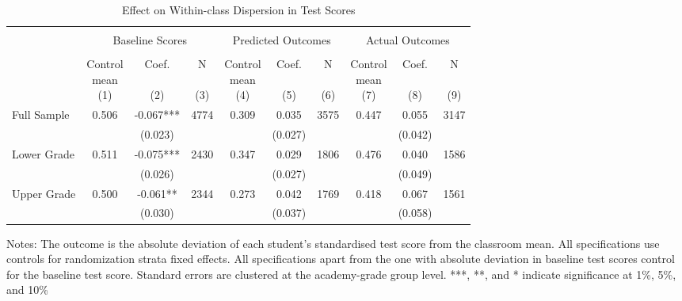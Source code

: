 \begin{table}[!h]
\centering\centering
\caption{Effect on Within-class Dispersion in Test Scores}
\centering
\begin{threeparttable}
\fontsize{10}{12}\selectfont
\begin{tabular}[t]{lccccccccc}
\toprule
\multicolumn{10}{c}{ } \\

\multicolumn{1}{c}{ } & \multicolumn{3}{c}{Baseline Scores} & \multicolumn{3}{c}{Predicted Outcomes} & \multicolumn{3}{c}{Actual Outcomes} \\
\cmidrule(l{3pt}r{3pt}){2-4} \cmidrule(l{3pt}r{3pt}){5-7} \cmidrule(l{3pt}r{3pt}){8-10}
\multicolumn{10}{c}{ } \\

  & \makecell{Control \\ mean \\ (1)} & \makecell{Coef. \\  \\ (2)} & \makecell{N \\ \\ (3)} & \makecell{Control \\ mean \\ (4)} & \makecell{Coef. \\ \\ (5)} & \makecell{N \\ \\ (6)} & \makecell{Control \\ mean \\ (7)} & \makecell{Coef. \\ \\ (8)} & \makecell{N \\ \\ (9)}\\
\midrule
Full Sample & 0.506 & -0.067*** & 4774 & 0.309 & 0.035 & 3575 & 0.447 & 0.055 & 3147\\
 &  & (0.023) &  &  & (0.027) &  &  & (0.042) & \\
Lower Grade & 0.511 & -0.075*** & 2430 & 0.347 & 0.029 & 1806 & 0.476 & 0.040 & 1586\\
 &  & (0.026) &  &  & (0.027) &  &  & (0.049) & \\
Upper Grade & 0.500 & -0.061** & 2344 & 0.273 & 0.042 & 1769 & 0.418 & 0.067 & 1561\\
 &  & (0.030) &  &  & (0.037) &  &  & (0.058) & \\
\hline
\bottomrule
\end{tabular}
\begin{tablenotes}[para]
\item Notes: The outcome is the absolute deviation of each student's standardised test score from the classroom mean. All specifications use controls for randomization strata fixed effects. All specifications apart from the one with absolute deviation in baseline test scores control for the baseline test score. Standard errors are clustered at the academy-grade group level. ***, **, and * indicate significance at 1\%, 5\%, and 10\%
\end{tablenotes}
\end{threeparttable}
\end{table}
